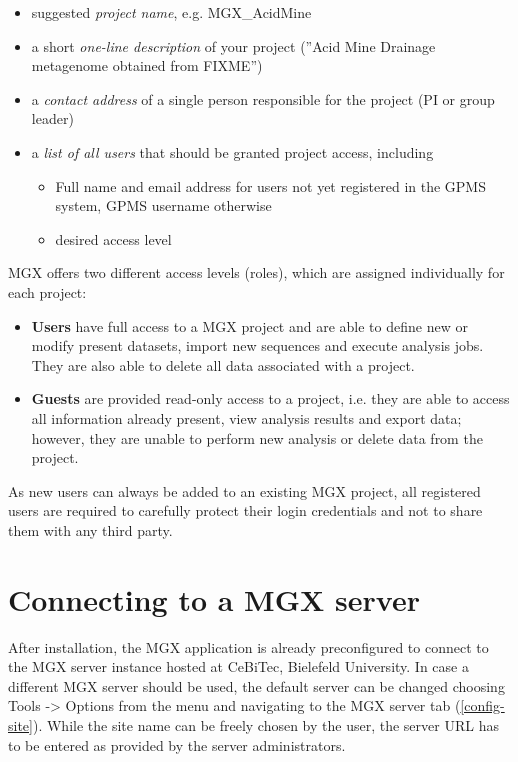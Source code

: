 \begin{itemize}
  \item suggested \textit{project name}, e.g. MGX_AcidMine
  \item a short \textit{one-line description} of your project (''Acid Mine Drainage metagenome obtained from FIXME'')
  \item a \textit{contact address} of a single person responsible for the project (PI or group leader)
  \item a \textit{list of all users} that should be granted project access, including
    \begin{itemize}
      \item Full name and email address for users not yet registered in the GPMS system, GPMS username otherwise
      \item desired access level
    \end{itemize}
\end{itemize}

MGX offers two different access levels (roles), which are assigned individually for each
project: \\

\begin{itemize}
  \item \textbf{Users} have full access to a MGX project and are able to define new or modify
present datasets, import new sequences and execute analysis jobs. They are also able to
delete all data associated with a project.\\
  \item \textbf{Guests} are provided read-only access to a project, i.e. they are able to access
all information already present, view analysis results and export data; however, they are
unable to perform new analysis or delete data from the project.
\end{itemize}

As new users can always be added to an existing MGX project, all registered users are required
to carefully protect their login credentials and not to share them with any third party.

\section{Connecting to a MGX server}

After installation, the MGX application is already preconfigured to connect to the 
MGX server instance hosted at CeBiTec, Bielefeld University. In case a different MGX server
should be used, the default server can be changed choosing Tools -> Options from the menu
and navigating to the MGX server tab (\ref{config-site}). While the site name can be freely
chosen by the user, the server URL has to be entered as provided by the server administrators.

